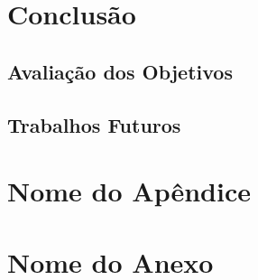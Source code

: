 \documentclass[openright]{normas-utf-tex} %
\begin{document}
\chapter{Conclusão}
\label{chpa:conc}
	
	\section{Avaliação dos Objetivos}

		

	\section{Trabalhos Futuros}

		


\clearpage %
\label{bibstart}
\label{bibend}

\apendice
\chapter{Nome do Ap\^endice}

\anexo
\chapter{Nome do Anexo}
\end{document}

